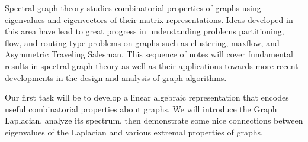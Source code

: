 Spectral graph theory studies combinatorial properties of graphs using eigenvalues and eigenvectors of their matrix representations. Ideas developed in this area have lead to great progress in understanding problems partitioning, flow, and routing type problems on graphs such as clustering, maxflow, and Asymmetric Traveling Salesman. This sequence of notes will cover fundamental results in spectral graph theory as well as their applications towards more recent developments in the design and analysis of graph algorithms.

Our first task will be to develop a linear algebraic representation that encodes useful combinatorial properties about graphs. We will introduce the Graph Laplacian, analyze its spectrum, then demonstrate some nice connections between eigenvalues of the Laplacian and various extremal properties of graphs.
